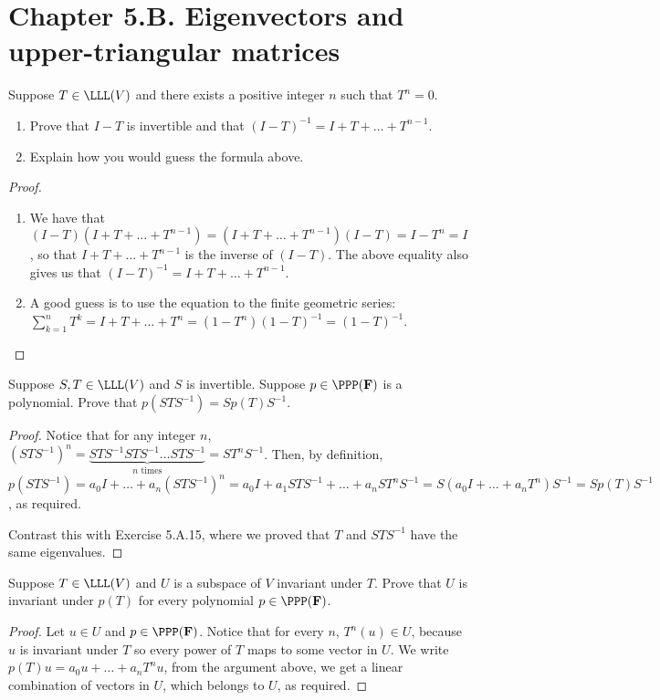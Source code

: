 \section*{Chapter 5.B. Eigenvectors and upper-triangular matrices}


\begin{exercise}{1}
  Suppose $T\in\LLL(V)$ and there exists a positive integer $n$ such that $T^n=0$.
  \begin{enumerate}
      \item Prove that $I-T$ is invertible and that $(I-T)^{-1}=I+T+\dots+T^{n-1}$.
      \item Explain how you would guess the formula above.
  \end{enumerate}
\end{exercise}
\begin{proof}
 \begin{enumerate}
     \item We have that $(I-T)(I+T+\dots+T^{n-1})= (I+T+\dots+T^{n-1})(I-T)= I-T^n= I$, so that $I+T+\dots+T^{n-1}$ is the inverse of $(I-T)$. The above equality also gives us that $(I-T)^{-1}=I+T+\dots+T^{n-1}$.
     \item A good guess is to use the equation to the finite geometric series: $\sum_{k=1}^n T^k= I+T+\dots+T^{n}= (1-T^n)(1-T)^{-1}= (1-T)^{-1}$.
 \end{enumerate}
\end{proof}

\begin{exercise}{5}
  Suppose $S,T\in\LLL(V)$ and $S$ is invertible. Suppose $p\in\PPP(\bF)$ is a polynomial. Prove that $p(STS^{-1})=Sp(T)S^{-1}$.
\end{exercise}
\begin{proof}
 Notice that for any integer $n$, $(STS^{-1})^n= \underbrace{STS^{-1}STS^{-1}\dots STS^{-1}}_{\text{$n$ times}}= ST^nS^{-1}$. Then, by definition, $p(STS^{-1})= a_0I+\dots+a_n(STS^{-1})^n= a_0I+a_1STS^{-1}+\dots+a_nST^nS^{-1}= S(a_0I+\dots+a_nT^n)S^{-1}= Sp(T)S^{-1}$, as required.

 Contrast this with Exercise 5.A.15, where we proved that $T$ and $STS^{-1}$ have the same eigenvalues.
\end{proof}

\begin{exercise}{6}
  Suppose $T\in\LLL(V)$ and $U$ is a subspace of $V$ invariant under $T$. Prove that $U$ is invariant under $p(T)$ for every polynomial $p\in\PPP(\bF)$.
\end{exercise}
\begin{proof}
 Let $u\in U$ and $p\in\PPP(\bF)$. Notice that for every $n$, $T^n(u)\in U$, because $u$ is invariant under $T$ so every power of $T$ maps to some vector in $U$. We write $p(T)u=a_0u+\dots+a_nT^nu$, from the argument above, we get a linear combination of vectors in $U$, which belongs to $U$, as required.
\end{proof}

